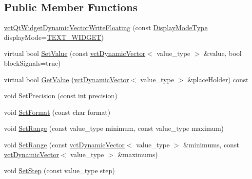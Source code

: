 \subsection*{Public Member Functions}
\begin{DoxyCompactItemize}
\item 
\hyperlink{classvct_qt_widget_dynamic_vector_write_floating_a7a52edc2beb9d6d2c611fe95e2d527c1}{vct\+Qt\+Widget\+Dynamic\+Vector\+Write\+Floating} (const \hyperlink{classvct_qt_widget_dynamic_vector_write_base_aefbf6a51f1009f060305c2b5e106cf02}{Display\+Mode\+Type} display\+Mode=\hyperlink{classvct_qt_widget_dynamic_vector_write_base_aefbf6a51f1009f060305c2b5e106cf02aa84e1bae39afe989e862b07258d0889e}{T\+E\+X\+T\+\_\+\+W\+I\+D\+G\+E\+T})
\item 
virtual bool \hyperlink{classvct_qt_widget_dynamic_vector_write_floating_a76a5c456bddfe42347c14758d1d4b97d}{Set\+Value} (const \hyperlink{classvct_dynamic_vector}{vct\+Dynamic\+Vector}$<$ value\+\_\+type $>$ \&value, bool block\+Signals=true)
\item 
virtual bool \hyperlink{classvct_qt_widget_dynamic_vector_write_floating_a20fd872d576e23301dab4160d76c6cb3}{Get\+Value} (\hyperlink{classvct_dynamic_vector}{vct\+Dynamic\+Vector}$<$ value\+\_\+type $>$ \&place\+Holder) const 
\item 
void \hyperlink{classvct_qt_widget_dynamic_vector_write_floating_adc5d05c37e5661b4b1135f8f1f789864}{Set\+Precision} (const int precision)
\item 
void \hyperlink{classvct_qt_widget_dynamic_vector_write_floating_a207f70b5aa4c9b12f61b563fcf79bfb8}{Set\+Format} (const char format)
\item 
void \hyperlink{classvct_qt_widget_dynamic_vector_write_floating_a5200838704a33065494e0931b0760098}{Set\+Range} (const value\+\_\+type minimum, const value\+\_\+type maximum)
\item 
void \hyperlink{classvct_qt_widget_dynamic_vector_write_floating_a506fb335090b5e6c14e591a683c2e5d4}{Set\+Range} (const \hyperlink{classvct_dynamic_vector}{vct\+Dynamic\+Vector}$<$ value\+\_\+type $>$ \&minimums, const \hyperlink{classvct_dynamic_vector}{vct\+Dynamic\+Vector}$<$ value\+\_\+type $>$ \&maximums)
\item 
void \hyperlink{classvct_qt_widget_dynamic_vector_write_floating_aab56caf76f149337025a81e5e30650ee}{Set\+Step} (const value\+\_\+type step)
\end{DoxyCompactItemize}
